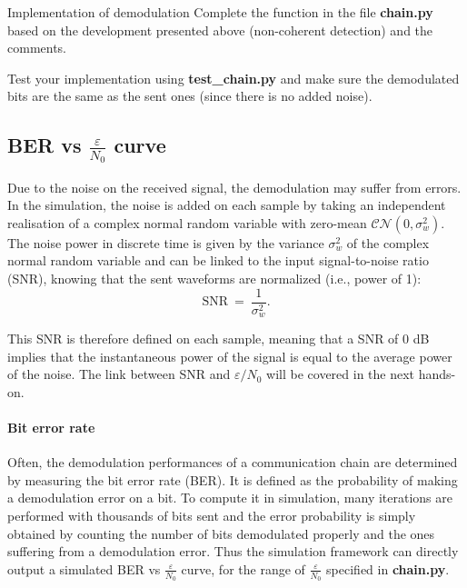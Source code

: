\begin{bclogo}[couleur = gray!20, arrondi = 0.2, logo=\bccrayon]{Implementation of demodulation}
Complete the  function in the file \textbf{chain.py} based on the development presented above (non-coherent detection) and the comments.

Test your implementation using \textbf{test\_chain.py} and make sure the demodulated bits are the same as the sent ones (since there is no added noise).
\end{bclogo}

\subsection{BER vs $\frac{\varepsilon}{N_0}$ curve}
Due to the noise on the received signal, the demodulation may suffer from errors. In the simulation, the noise is added on each sample by taking an independent realisation of a complex normal random variable with zero-mean $\mathcal{CN}(0,\sigma_w^2)$. The noise power in discrete time is given by the variance $\sigma_w^2$ of the complex normal random variable and can be linked to the input signal-to-noise ratio (SNR), knowing that the sent waveforms are normalized (i.e., power of 1):
\begin{equation*}
    \text{SNR}\:=\:\frac{1}{\sigma_w^2}.
\end{equation*}

This SNR is therefore defined on each sample, meaning that a SNR of 0 dB implies that the instantaneous power of the signal is equal to the average power of the noise. The link between SNR and $\varepsilon / N_0$ will be covered in the next hands-on.



\paragraph{Bit error rate}
Often, the demodulation performances of a communication chain are determined by measuring the bit error rate (BER). It is defined as the probability of making a demodulation error on a bit. To compute it in simulation, many iterations are performed with thousands of bits sent and the error probability is simply obtained by counting the number of bits demodulated properly and the ones suffering from a demodulation error. Thus the simulation framework can directly output a simulated BER vs $\frac{\varepsilon}{N_0}$ curve, for the range of $\frac{\varepsilon}{N_0}$ specified in \textbf{chain.py}.

